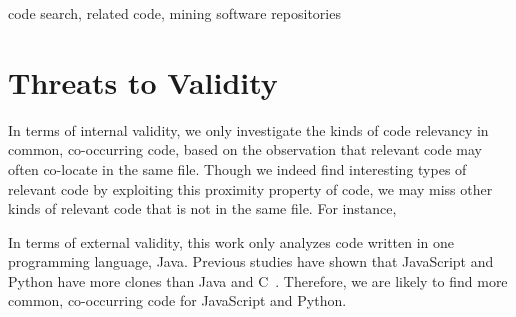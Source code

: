 \documentclass[conference]{IEEEtran}
\begin{document}
\begin{abstract}

\end{abstract}

\begin{IEEEkeywords}
code search, related code, mining software repositories
\end{IEEEkeywords}











\section{Threats to Validity}
In terms of internal validity, we only investigate the kinds of code relevancy in common, co-occurring code, based on the observation that relevant code may often co-locate in the same file. Though we indeed find interesting types of relevant code by exploiting this proximity property of code, we may miss other kinds of relevant code that is not in the same file. For instance,  

In terms of external validity, this work only analyzes code written in one programming language, Java. Previous studies have shown that JavaScript and Python have more clones than Java and C~\cite{lopes2017dejavu, yang2017stack}. Therefore, we are likely to find more common, co-occurring code for JavaScript and Python. 
\end{document}
